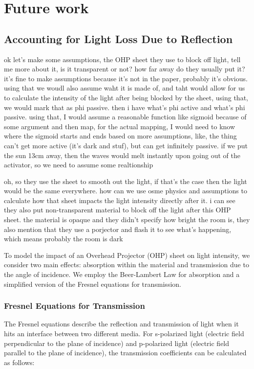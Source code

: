 \chapter{Future work}
\section{Accounting for Light Loss Due to Reflection}
ok let's make some assumptions, the OHP sheet they use to block off light, tell me more about it, is it transparent or not? how far away do they usually put it? it's fine to make assumptions because it's not in the paper, probably it's obvious. using that we woudl also assume waht it is made of, and taht would allow for us to calculate the intensity of the light after being blocked by the sheet, using that, we would mark that as phi passive. then i have what's phi active and what's phi passive. using that, I would assume a reasonable function like sigmoid because of some argument and then map, for the actual mapping, I would need to know where the sigmoid starts and ends based on more assumptions, like, the thing can't get more active (it's dark and stuf), but can get infinitely passive. if we put the sun 13cm away, then the waves would melt instantly upon going out of the activator, so we need to assume some realtionship


oh, so they use the sheet to smooth out the light, if that's the case then the light would be the same everywhere. how can we use osme physics and assumptions to calculate how that sheet impacts the light intensity directly after it.
i can see they also put non-transparent material to block off the light after this OHP sheet. the material is opaque and they didn't specify how bright the room is, they also mention that they use a porjector and flash it to see what's happening, which means probably the room is dark


To model the impact of an Overhead Projector (OHP) sheet on light intensity, we consider two main effects: absorption within the material and transmission due to the angle of incidence. We employ the Beer-Lambert Law for absorption and a simplified version of the Fresnel equations for transmission.

\subsection*{Fresnel Equations for Transmission}
The Fresnel equations describe the reflection and transmission of light when it hits an interface between two different media. For s-polarized light (electric field perpendicular to the plane of incidence) and p-polarized light (electric field parallel to the plane of incidence), the transmission coefficients can be calculated as follows:

